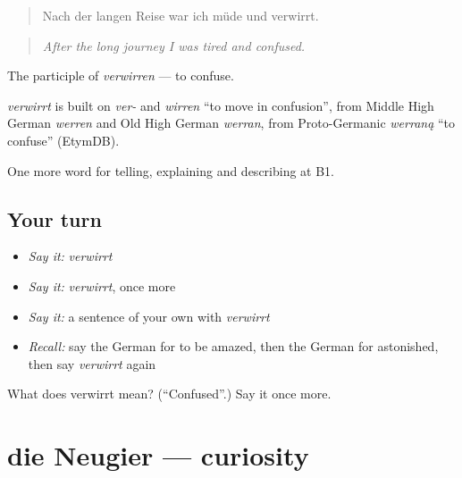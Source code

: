 \begin{quote}
Nach der langen Reise war ich müde und verwirrt.
\end{quote}

\begin{quote}
\emph{After the long journey I was tired and confused.}
\end{quote}

The participle of \emph{verwirren} — to confuse.

\begin{cousinweb}
\emph{verwirrt} is built on \emph{ver-} and \emph{wirren} \textquotedblleft{}to move in confusion\textquotedblright{}, from Middle High German \emph{werren} and Old High German \emph{werran}, from Proto-Germanic \emph{werraną} \textquotedblleft{}to confuse\textquotedblright{} (EtymDB).
\end{cousinweb}

\begin{grammarlens}[title={What you've built}]
One more word for telling, explaining and describing at B1.
\end{grammarlens}

\subsection*{Your turn}
\begin{itemize}
\raggedright
  \item \emph{Say it:} \emph{verwirrt}
  \item \emph{Say it:} \emph{verwirrt}, once more
  \item \emph{Say it:} a sentence of your own with \emph{verwirrt}
  \item \emph{Recall:} say the German for to be amazed, then the German for astonished, then say \emph{verwirrt} again
\end{itemize}

\begin{tcolorbox}[breakable,colback=teal!4,colframe=teal!35!black,title={Before you move on}]
What does verwirrt mean? (\textquotedblleft{}Confused\textquotedblright{}.) Say it once more.
\end{tcolorbox}
\section[die Neugier]{die Neugier — curiosity}

\label{lesson:GE-C474-neugier}



